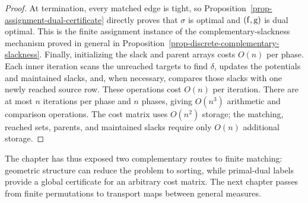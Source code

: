 \begin{proof}
	At termination, every matched edge is tight, so Proposition~\ref{prop-assignment-dual-certificate} directly proves that $\sigma$ is optimal and $(\mathrm{f},\mathrm{g})$ is dual optimal. This is the finite assignment instance of the complementary-slackness mechanism proved in general in Proposition~\ref{prop-discrete-complementary-slackness}.
	Finally, initializing the slack and parent arrays costs $O(n)$ per phase. Each inner iteration scans the unreached targets to find $\delta$, updates the potentials and maintained slacks, and, when necessary, compares those slacks with one newly reached source row. These operations cost $O(n)$ per iteration. There are at most $n$ iterations per phase and $n$ phases, giving $O(n^3)$ arithmetic and comparison operations. The cost matrix uses $O(n^2)$ storage; the matching, reached sets, parents, and maintained slacks require only $O(n)$ additional storage.
\end{proof}

The chapter has thus exposed two complementary routes to finite matching: geometric structure can reduce the problem to sorting, while primal-dual labels provide a global certificate for an arbitrary cost matrix. The next chapter passes from finite permutations to transport maps between general measures.
